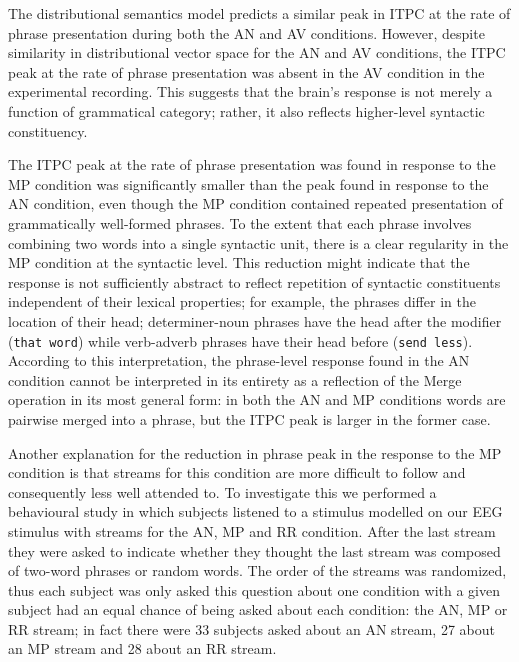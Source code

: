 \documentclass[11pt,a4wide]{article}
\newcommand{\citet}[1]{\cite{#1}}
\begin{document}
The distributional semantics model predicts a similar peak in ITPC at
the rate of phrase presentation during both the AN and AV
conditions. However, despite similarity in distributional vector space
for the AN and AV conditions, the ITPC peak at the rate of phrase
presentation was absent in the AV condition in the experimental
recording. This suggests that the brain's response is not merely a
function of grammatical category; rather, it also reflects
higher-level syntactic constituency.

The ITPC peak at the rate of phrase presentation was found in response
to the MP condition was significantly smaller than the peak found in
response to the AN condition, even though the MP condition contained
repeated presentation of grammatically well-formed phrases. To the
extent that each phrase involves combining two words into a single
syntactic unit, there is a clear regularity in the MP condition at the
syntactic level. This reduction might indicate that the response is
not sufficiently abstract to reflect repetition of syntactic
constituents independent of their lexical properties; for example, the
phrases differ in the location of their head; determiner-noun phrases
have the head after the modifier (\texttt{that word}) while
verb-adverb phrases have their head before (\texttt{send
  less}). According to this interpretation, the phrase-level response
found in the AN condition cannot be interpreted in its entirety as a
reflection of the Merge operation \citet{Chomsky1995} in its most
general form: in both the AN and MP conditions words are pairwise
merged into a phrase, but the ITPC peak is larger in the former case.

Another explanation for the reduction in phrase peak in the response
to the MP condition is that streams for this condition are more
difficult to follow and consequently less well attended to. To
investigate this we performed a behavioural study in which subjects
listened to a stimulus modelled on our EEG stimulus with streams for
the AN, MP and RR condition. After the last stream they were asked to
indicate whether they thought the last stream was composed of two-word
phrases or random words. The order of the streams was randomized, thus
each subject was only asked this question about one condition with a
given subject had an equal chance of being asked about each condition:
the AN, MP or RR stream; in fact there were 33 subjects asked about an
AN stream, 27 about an MP stream and 28 about an RR stream.
\end{document}
